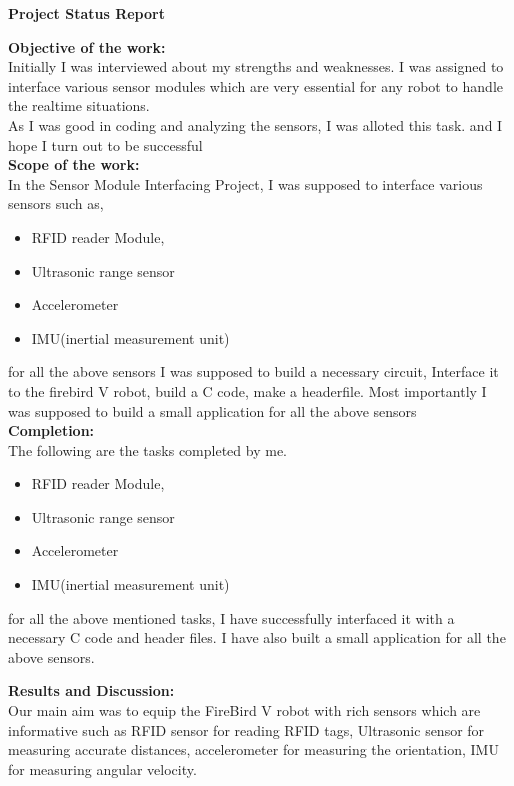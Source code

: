 \documentclass[a4paper,12 pt]{article}
\begin{document}
\begin{center}
\textbf{\large Project Status Report}
\end{center}
 
\textbf{Objective of the work: }\\Initially I was interviewed about my strengths and weaknesses. I was assigned to interface various sensor modules which are very essential for any robot to handle the realtime situations.\\ As I was good in coding and analyzing the sensors, I was alloted this task. and I hope I turn out to be successful
   \\
 
\textbf{Scope of the work: }\\In the Sensor Module Interfacing Project, I was supposed to interface various sensors such as,
\begin{itemize}
\item RFID reader Module,
\item Ultrasonic range sensor
\item Accelerometer
\item IMU(inertial measurement unit)
\end{itemize}
for all the above sensors I was supposed to build a necessary circuit, Interface it to the firebird V robot, build a C code, make a headerfile. Most importantly I was supposed to build a small application for all the above sensors\\ 

 
\textbf{Completion: }\\ The following are the tasks completed by me.
\begin{itemize}
\item RFID reader Module,
\item Ultrasonic range sensor
\item Accelerometer
\item IMU(inertial measurement unit)
\end{itemize}
for all the above mentioned tasks, I have successfully interfaced it with a necessary C code and header files.
I have also built a small application for all the above sensors.
 
\textbf{Results and Discussion:}\\ 

Our main aim was to equip the FireBird V robot with rich sensors which are informative such as RFID sensor for reading RFID tags, Ultrasonic sensor for measuring accurate distances, accelerometer for measuring the orientation, IMU for measuring angular velocity.
\end{document}

